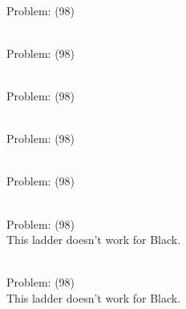 \documentclass[11pt]{article}
\begin{document}
\begin{minipage}[t]{0.5\textwidth}
  {\centering
  
\\
Problem: (98)\\
  }
\end{minipage}
\begin{minipage}[t]{0.5\textwidth}
  {\centering
  
\\
Problem: (98)\\
  }
\end{minipage}
\begin{minipage}[t]{0.5\textwidth}
  {\centering
  
\\
Problem: (98)\\
  }
\end{minipage}
\begin{minipage}[t]{0.5\textwidth}
  {\centering
  
\\
Problem: (98)\\
  }
\end{minipage}
\begin{minipage}[t]{0.5\textwidth}
  {\centering
  
\\
Problem: (98)\\
  }
\end{minipage}
\begin{minipage}[t]{0.5\textwidth}
  {\centering
  
\\
Problem: (98)\\
This ladder doesn't work for Black.\\
  }
\end{minipage}
\begin{minipage}[t]{0.5\textwidth}
  {\centering
  
\\
Problem: (98)\\
This ladder doesn't work for Black.\\
  }
\end{minipage}
\end{document}
